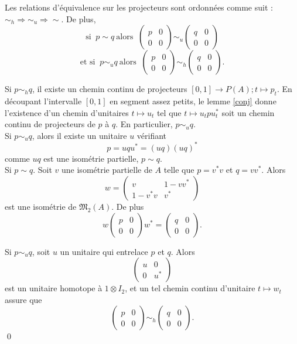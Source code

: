 \begin{prop}
Les relations d'équivalence sur les projecteurs sont ordonnées comme suit : $\sim_h \Rightarrow \sim_u \Rightarrow \sim$. De plus,
\[\text{si }\ p\sim q \ \text{alors }\ \begin{pmatrix}p & 0 \\ 0 & 0 \end{pmatrix}\sim_u \begin{pmatrix}q & 0 \\ 0 & 0 \end{pmatrix} \]
\[\text{et si }\ p\sim_u q \ \text{alors }\ \begin{pmatrix}p & 0 \\ 0 & 0 \end{pmatrix}\sim_h \begin{pmatrix}q & 0 \\ 0 & 0 \end{pmatrix}. \]
\end{prop}
\begin{dem}
Si $p\sim_h q$, il existe un chemin continu de projecteurs $[0,1]\rightarrow P(A);t\mapsto p_t$. En découpant l'intervalle $[0,1]$ en segment assez petits, le lemme \ref{conj} donne l'existence d'un chemin d'unitaires $t\mapsto u_t$ tel que $t\mapsto u_t p u_t^*$ soit un chemin continu de projecteurs de $p$ à $q$. En particulier, $p\sim_u q$.\\

Si $p\sim_u q$, alors il existe un unitaire $u$ vérifiant
\[p= u q u^* = (u q)(u q)^*\]
comme $uq$ est une isométrie partielle, $p\sim q$.\\

Si $p\sim q$. Soit $v$ une isométrie partielle de $A$ telle que $p=v^*v$ et $q = vv^*$. Alors 
\[w=\begin{pmatrix} v & 1-vv^*\\1-v^* v  & v^*\end{pmatrix}\]
est une isométrie de $\mathfrak M_2 (A)$. De plus
\[w\begin{pmatrix}p & 0 \\ 0 & 0 \end{pmatrix}w^*=\begin{pmatrix}q & 0 \\ 0 & 0 \end{pmatrix}.\]

Si $p\sim_u q$, soit $u$ un unitaire qui entrelace $p$ et $q$. Alors 
\[\begin{pmatrix}u & 0 \\ 0 & u^* \end{pmatrix}\]
est un unitaire homotope à $1\otimes I_2$, et un tel chemin continu d'unitaire $t\mapsto w_t$ assure que
\[\begin{pmatrix}p & 0 \\ 0 & 0 \end{pmatrix}\sim_h \begin{pmatrix}q & 0 \\ 0 & 0 \end{pmatrix}.\] 
\qed
\end{dem}

